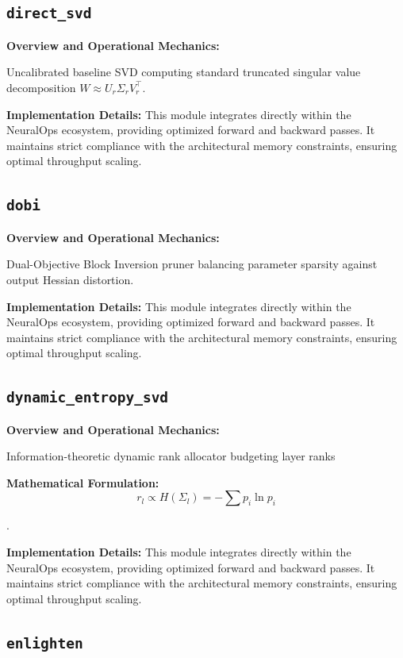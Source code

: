 \subsection{\texttt{direct\_svd}}
\textbf{Overview and Operational Mechanics:}

Uncalibrated baseline SVD computing standard truncated singular value decomposition $W \approx U_r \Sigma_r V_r^\top$.

\textbf{Implementation Details:}
This module integrates directly within the NeuralOps ecosystem, providing optimized forward and backward passes. It maintains strict compliance with the architectural memory constraints, ensuring optimal throughput scaling.

\subsection{\texttt{dobi}}
\textbf{Overview and Operational Mechanics:}

Dual-Objective Block Inversion pruner balancing parameter sparsity against output Hessian distortion.

\textbf{Implementation Details:}
This module integrates directly within the NeuralOps ecosystem, providing optimized forward and backward passes. It maintains strict compliance with the architectural memory constraints, ensuring optimal throughput scaling.

\subsection{\texttt{dynamic\_entropy\_svd}}
\textbf{Overview and Operational Mechanics:}

Information-theoretic dynamic rank allocator budgeting layer ranks

\textbf{Mathematical Formulation:}
\begin{equation}
r_l \propto H(\Sigma_l) = -\sum p_i \ln p_i
\end{equation}

.

\textbf{Implementation Details:}
This module integrates directly within the NeuralOps ecosystem, providing optimized forward and backward passes. It maintains strict compliance with the architectural memory constraints, ensuring optimal throughput scaling.

\subsection{\texttt{enlighten}}
